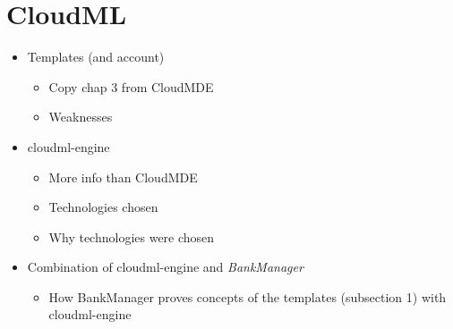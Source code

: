 \section{CloudML}

\begin{itemize}
  \item Templates (and account)
    \begin{itemize}
      \item Copy chap 3 from CloudMDE
      \item Weaknesses
    \end{itemize}
  \item cloudml-engine
    \begin{itemize}
      \item More info than CloudMDE
      \item Technologies chosen
      \item Why technologies were chosen
    \end{itemize}
  \item Combination of cloudml-engine and \emph{BankManager}
    \begin{itemize}
      \item How BankManager proves concepts of the templates (subsection 1) with cloudml-engine
    \end{itemize}
\end{itemize}
